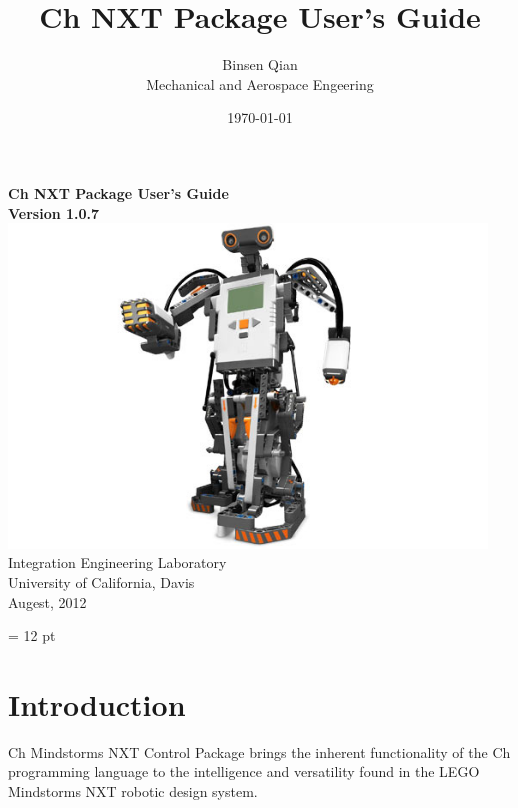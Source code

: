 \documentclass[11pt]{article}
\title{Ch NXT Package User's Guide}
\author{Binsen Qian\\Mechanical and Aerospace Engeering}
\date{\today}
\begin{document}
\begin{titlepage}
\begin{center}
\vspace*{2cm}
{\Huge\sf\bf Ch NXT Package User's Guide}\\
\vspace*{2cm}
{\bf Version 1.0.7}\\
\vspace*{2cm}
\includegraphics[width = 5in]{figure/mindstorm/NXT_humanoid.png}
\vspace*{2cm}
\newline
Integration Engineering Laboratory\\
University of California, Davis\\
Augest, 2012\\
\end{center}
\end{titlepage}




\newpage
\tableofcontents
\newpage

\baselineskip = 12 pt

\section{Introduction}
Ch Mindstorms NXT Control Package brings the inherent functionality of the Ch programming language
to the intelligence and versatility found in the LEGO Mindstorms NXT robotic design system.\\
\end{document}
